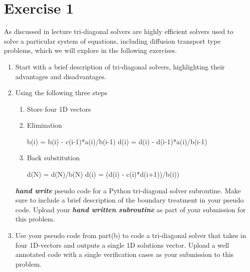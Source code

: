 \documentclass[12pt]{article}
\begin{document}
\section{Exercise 1}
As discussed in lecture tri-diagonal solvers are highly efficient
solvers used to solve a particular system of equations, including
diffusion transport type problems, which we will explore in the following
exercises. 
\begin{enumerate}[label=(\alph*)]
    \item Start with a brief description of tri-diagonal solvers,
        highlighting their advantages and disadvantages.
        
    \item Using the following three steps
        \begin{enumerate}[label=(\arabic*)]
            \item Store four 1D vectors 
            \item Elimination
                \begin{algorithmic}
                    \STATE b(i) = b(i) - c(i-1)*a(i)/b(i-1)
                    \STATE d(i) = d(i) - d(i-1)*a(i)/b(i-1)
                    \ENDFOR
                \end{algorithmic}
            \item Back substitution 
                \begin{algorithmic}
                    \STATE d(N) = d(N)/b(N)
                    \STATE d(i) = (d(i) - c(i)*d(i+1))/b(i))
                    \ENDFOR
                \end{algorithmic}
        \end{enumerate}
    \emph{\textbf{hand write}} pseudo code for a Python tri-diagonal solver
        subroutine. Make sure to include a brief description of the
        boundary treatment in your pseudo code. Upload your
        \emph{\textbf{hand written subroutine}} as part of your submission
        for this problem.
    
    \item Use your pseudo code from part(b) to code a tri-diagonal solver
        that takes in four 1D-vectors and outputs a single 1D solutions
        vector.  Upload a well annotated code with a single verification
        cases as your submission to this problem.
\end{enumerate}

\newpage
\end{document}
